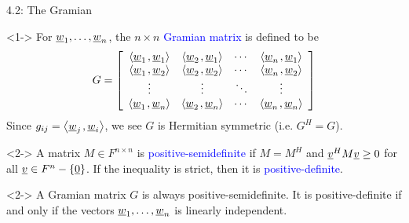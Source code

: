 \documentclass[10pt,letterpaper,english]{beamer}
\begin{document}
\begin{frame}{4.2: The Gramian}

\begin{definition}<1->
For $\underline{w}_1,\ldots,\underline{w}_n$, the $n \times n$ \textcolor{blue}{Gramian matrix} is defined to be \vspace{-1.5mm}
\begin{equation*}
G = \left[ \begin{array}{cccc}
\inner{ \vecnot{w}_1 }{ \vecnot{w}_1 }
& \inner{ \vecnot{w}_2 }{ \vecnot{w}_1 } & \cdots
& \inner{ \vecnot{w}_n }{ \vecnot{w}_1 } \\
\inner{ \vecnot{w}_1 }{ \vecnot{w}_2 }
& \inner{ \vecnot{w}_2 }{ \vecnot{w}_2 } & \cdots
& \inner{ \vecnot{w}_n }{ \vecnot{w}_2 } \\
\vdots & \vdots & \ddots & \vdots \\
\inner{ \vecnot{w}_1 }{ \vecnot{w}_n }
& \inner{ \vecnot{w}_2 }{ \vecnot{w}_n } & \cdots
& \inner{ \vecnot{w}_n }{ \vecnot{w}_n }
\end{array} \right] \vspace{-1mm}
\end{equation*}
Since $g_{ij} = {\left\langle  \underline{w}_j  \mskip2mu ,  \underline{w}_i  \right\rangle}$, we see $G$ is Hermitian symmetric (i.e. $G^H = G$).
\end{definition}

\begin{definition}<2->
A matrix $M\in F^{n \times n}$ is \textcolor{blue}{positive-semidefinite} if $M=M^H$ and $\underline{v}^H M \underline{v} \geq 0$ for all $\underline{v} \in F^n - \left\{ \underline{0} \right\}$.
If the inequality is strict, then it is \textcolor{blue}{positive-definite}.
\end{definition}


\begin{theorem}<2->
A Gramian matrix $G$ is always positive-semidefinite.
It is positive-definite if and only if the vectors $\underline{w}_1, \ldots, \underline{w}_n$ is linearly independent.
\end{theorem}


\end{frame}
\end{document}
